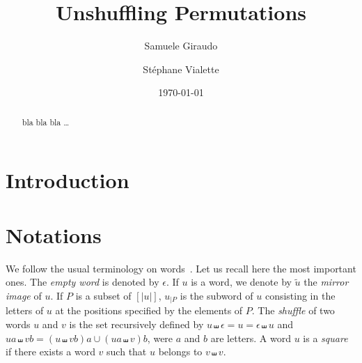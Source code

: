 \documentclass[a4paper,10pt]{llncs}
\begin{document}

\title{%
Unshuffling Permutations}%

\author{%
  Samuele Giraudo \and
  St\'ephane Vialette
}%
\date{\today}

\maketitle


\begin{abstract}
bla bla bla \ldots
\end{abstract}


\section{Introduction}
\label{section:Introduction}



\section{Notations}
\label{section:Notations}

We follow the usual terminology on words~\cite{ChoffrutKarhumaki1997}.
Let us recall here the most important ones. The {\em empty word} is
denoted by $\epsilon$. If $u$ is a word, we denote by $\widetilde{u}$
the {\em mirror image} of $u$. If $P$ is a subset of $[|u|]$, $u_{|P}$
is the subword of $u$ consisting in the letters of $u$ at the positions
specified by the elements of $P$. The {\em shuffle} of two words $u$ and
$v$ is the set recursively defined by
$u \shuffle \epsilon = u = \epsilon \shuffle u$ and
$ua \shuffle vb = (u \shuffle vb)a \cup (ua \shuffle v)b$, were $a$ and
$b$ are letters. A word $u$ is a {\em square} if there exists a word $v$
such that $u$ belongs to $v \shuffle v$.
\medskip
\end{document}
